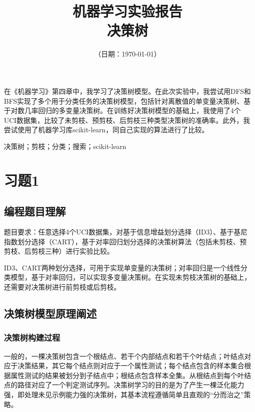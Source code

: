\documentclass{ctexart}
\title{\textbf{机器学习实验报告\\{\Large{决策树}}}} %
\author{\sffamily{朱天泽}} %
\date{（日期：\today）} %
\begin{document}
	\maketitle
	在《机器学习》第四章中，我学习了决策树模型。在此次实验中，我尝试用DFS和BFS实现了多个用于分类任务的决策树模型，包括针对离散值的单变量决策树、基于对数几率回归的多变量决策树。在训练好决策树模型的基础上，我使用了4个UCI数据集，比较了未剪枝、预剪枝、后剪枝三种类型决策树的准确率。此外，我尝试使用了机器学习库scikit-learn，同自己实现的算法进行了比较。
	
	 决策树；剪枝；分类；搜索；scikit-learn
	
	\section{习题1}
	\subsection{编程题目理解}
	题目要求：任意选择4个UCI数据集，对基于信息增益划分选择（ID3）、基于基尼指数划分选择（CART），基于对率回归划分选择的决策树算法（包括未剪枝、预剪枝、后剪枝三种）进行实验比较。
	
	ID3、CART两种划分选择，可用于实现单变量的决策树；对率回归是一个线性分类模型，基于对率回归，可以实现多变量决策树。在实现未剪枝决策树的基础上，还需要对决策树进行前剪枝或后剪枝。
	
	\subsection{决策树模型原理阐述}
	\subsubsection{决策树构建过程}
	一般的，一棵决策树包含一个根结点、若干个内部结点和若干个叶结点；叶结点对应于决策结果，其它每个结点则对应于一个属性测试；每个结点包含的样本集合根据属性测试的结果被划分到子结点中；根结点包含样本全集。从根结点到每个叶结点的路径对应了一个判定测试序列。决策树学习的目的是为了产生一棵泛化能力强，即处理未见示例能力强的决策树，其基本流程遵循简单且直观的“分而治之”策略。
	
\end{document}
